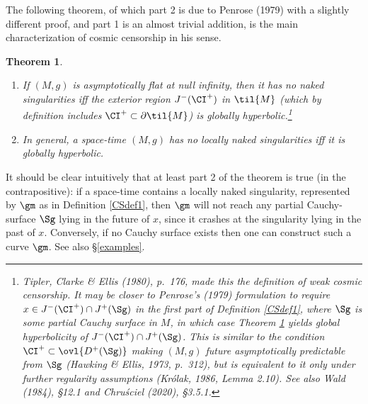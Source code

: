 \documentclass[11pt,a4paper]{article}
\newcommand{\p}{\partial}
\newtheorem{theorem}{Theorem}[section]
\begin{document}
The following theorem, of which part 2 is due to Penrose (1979) with a slightly different proof, and part 1 is an almost trivial addition, is the main characterization of cosmic censorship in his sense.  
 \begin{theorem}\label{P79theorem} 
\begin{enumerate}
\item  If $(M,g)$ is asymptotically flat at null infinity, then it has no  naked singularities iff the exterior region  $J^-(\CI^+)$ in $\til{M}$ (which by definition includes $\CI^+\subset\p\til{M}$)
is globally hyperbolic.\footnote{Tipler, Clarke \& Ellis (1980), p.\ 176,  made this the
\emph{definition} of weak cosmic censorship. It may be closer to Penrose's (1979) formulation to require 
$x\in J^-(\CI^+)\cap J^+(\Sg)$ in the first part of Definition \ref{CSdef1}, where $\Sg$ is some partial Cauchy surface in $M$,
in which case Theorem \ref{P79theorem} yields global hyperbolicity of $J^-(\CI^+)\cap J^+(\Sg)$. This is similar to the condition  $\CI^+\subset\ovl{D^+(\Sg)}$ making
 $(M,g)$  \emph{future asymptotically predictable} from $\Sg$ (Hawking \& Ellis, 1973, p.\ 312), but is equivalent to it only under further regularity assumptions (Kr\'{o}lak, 1986, Lemma 2.10). See also Wald (1984), \S 12.1 and Chru\'{s}ciel (2020), \S 3.5.1.
  }
\item In general, a space-time $(M,g)$ has no locally naked singularities iff it is globally hyperbolic.
\end{enumerate}
\end{theorem}
It should be clear intuitively that at least part 2 of the theorem is true (in the contrapositive): if a space-time contains a locally naked singularity, represented by $\gm$ as in Definition \ref{CSdef1}, then $\gm$ will not reach any partial Cauchy-surface $\Sg$ lying in the future of $x$, since it crashes at the singularity lying in the past of $x$. Conversely, if no Cauchy surface exists then one can construct such a curve $\gm$. See also \S\ref{examples}.  \smallskip
\end{document}

